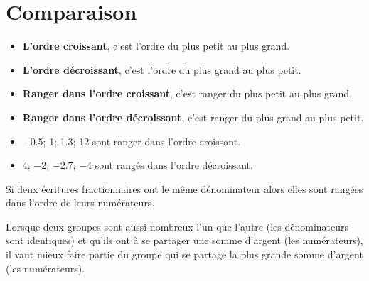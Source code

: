 \section{Comparaison}
\begin{definition}
    \begin{itemize}
        \item {\bf L'ordre croissant}, c'est l'ordre du plus petit au plus grand.
        \item {\bf L'ordre décroissant}, c'est l'ordre du plus grand au plus petit.
        \item {\bf Ranger dans l'ordre croissant}, c'est ranger du plus petit au plus grand.
        \item {\bf Ranger dans l'ordre décroissant}, c'est ranger du plus grand au plus petit.
    \end{itemize}
\end{definition}

\begin{exemples*1}
    \begin{itemize}
        \item \num{-0,5}; \num{1}; \num{1.3}; \num{12} sont ranger dans l'ordre croissant.
        \item \num{4}; \num{-2}; \num{-2.7}; \num{-4} sont rangés dans l'ordre décroissant.
    \end{itemize}
\end{exemples*1}

\begin{propriete}
    Si deux écritures fractionnaires ont le même dénominateur alors elles sont rangées dans l'ordre de leurs numérateurs.
\end{propriete}

\begin{preuve}
    Lorsque deux groupes sont aussi nombreux l'un que l'autre (les dénominateurs sont identiques) et qu'ils ont à se partager
    une somme d'argent (les numérateurs), il vaut mieux faire partie du groupe qui se partage la plus grande somme d'argent (les numérateurs).
\end{preuve}

